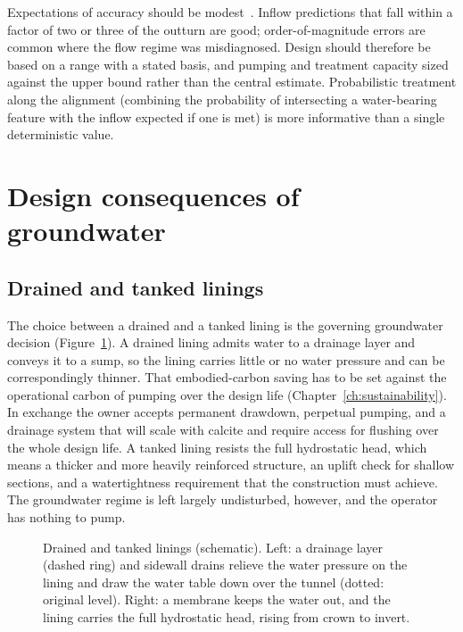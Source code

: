 Expectations of accuracy should be modest~\citep{heuer1995estimating}. Inflow
predictions that fall within a factor of two or three of the outturn are
good; order-of-magnitude errors are
common where the flow regime was misdiagnosed. Design should therefore be
based on a range with a stated basis, and pumping and treatment capacity sized
against the upper bound rather than the central estimate. Probabilistic
treatment along the alignment (combining the probability of intersecting a
water-bearing feature with the inflow expected if one is met) is more
informative than a single deterministic value.

\section{Design consequences of groundwater}
\label{sec:groundwater-consequences}

\subsection{Drained and tanked linings}
\label{sec:drained-vs-tanked}

The choice between a drained and a tanked lining is the governing groundwater
decision (Figure~\ref{fig:drained-tanked-lining}). A drained lining admits water to a
drainage layer and conveys it to a sump, so the lining carries little or no
water pressure and can be correspondingly thinner. That embodied-carbon saving
has to be set against the operational carbon of pumping over the design
life (Chapter~\ref{ch:sustainability}). In
exchange the owner accepts permanent drawdown, perpetual pumping, and a
drainage system that will scale with calcite and require access for flushing
over the whole design life. A tanked lining resists the full hydrostatic head,
which means a thicker and more heavily reinforced structure, an uplift check
for shallow sections, and a watertightness requirement that the construction
must achieve. The groundwater regime is left largely
undisturbed, however, and the operator has nothing to pump.

\begin{figure}[htbp]
\centering
{}
\caption{Drained and tanked linings (schematic). Left: a drainage layer (dashed ring) and sidewall drains relieve the water pressure on the lining and draw the water table down over the tunnel (dotted: original level). Right: a membrane keeps the water out, and the lining carries the full hydrostatic head, rising from crown to invert.}
\label{fig:drained-tanked-lining}
\end{figure}

